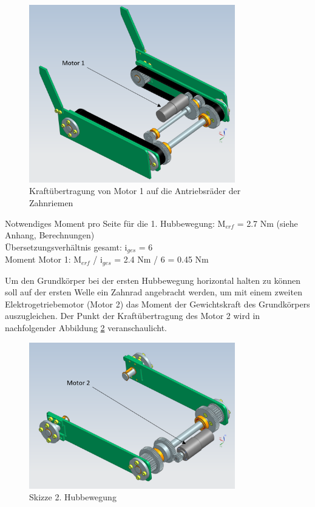 \begin{figure}[H]
  \includegraphics[width=0.8\textwidth]{img/Treppensteigen/Motor 1 final.PNG}
  \centering
  \caption{Kraftübertragung von Motor 1 auf die Antriebsräder der Zahnriemen}
  \label{fig:motor1-und-stützen}
\end{figure}

Notwendiges Moment pro Seite für die 1. Hubbewegung: M$_{erf}$ = 2.7 Nm (siehe Anhang, Berechnungen)\\

Übersetzungsverhältnis gesamt: i$_{ges}$ = 6\\

Moment Motor 1: M$_{erf}$ / i$_{ges}$ = 2.4 Nm / 6 = 0.45 Nm

\newpage

Um den Grundkörper bei der ersten Hubbewegung horizontal halten zu können soll auf der ersten Welle ein Zahnrad angebracht werden, um mit einem zweiten Elektrogetriebemotor (Motor 2) das Moment der Gewichtskraft des Grundkörpers auszugleichen. Der Punkt der Kraftübertragung des Motor 2 wird in nachfolgender Abbildung \ref{fig:motor-2} veranschaulicht.

\begin{figure}[H]
  \includegraphics[width=0.8\textwidth]{img/Treppensteigen/Motor 2 final.PNG}
  \centering
  \caption{Skizze 2. Hubbewegung}
  \label{fig:motor-2}
\end{figure}

